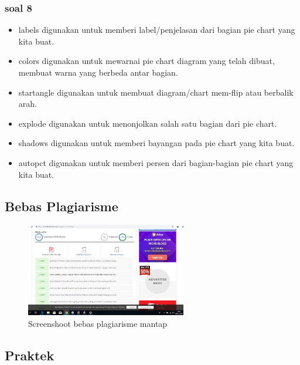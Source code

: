 \subsubsection{soal 8}
\begin{itemize}
\item labels digunakan untuk memberi label/penjelasan dari bagian pie chart yang kita buat.
\item colors digunakan untuk mewarnai pie chart diagram yang telah dibuat, membuat warna yang berbeda antar bagian.
\item startangle digunakan untuk membuat diagram/chart mem-flip atau berbalik arah.
\item explode digunakan untuk menonjolkan salah satu bagian dari pie chart.
\item shadows digunakan untuk memberi bayangan pada pie chart yang kita buat.
\item autopct digunakan untuk memberi persen dari bagian-bagian pie chart yang kita buat.
\end{itemize}

\subsection{Bebas Plagiarisme}
\begin{figure}[H]
\centering
\includegraphics[width=7cm]{figures/6/1174009/plagiaris.png}
\caption{Screenshoot bebas plagiarisme mantap}
\label{dwiyul}
\end{figure}

\subsection{Praktek}
